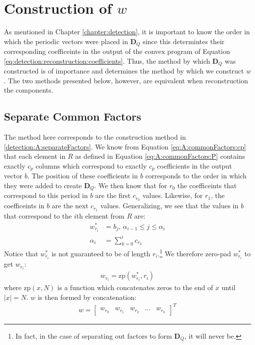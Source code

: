 \section{Construction of $w$}\label{section:extraction:constructionOfW}
As mentioned in Chapter \ref{chapter:detection}, it is important to know the order in which the periodic vectors were placed in $\bm{D}_Q$ since this determintes their corresponding coefficeints in the output of the convex program of Equation \eqref{eq:detection:reconstruction:coefficients}. Thus, the method by which $\bm{D}_Q$ was constructed is of importance and determines the method by which we construct $w$. The two methods presented below, however, are equivalent when reconstruction the components.

    \subsection{Separate Common Factors}\label{section:extraction:constructionOfw:separateFactors}
    The method here corresponds to the construction method in \ref{detection:A:separateFactors}. We know from Equation \eqref{eq:A:commonFactors:cp} that each element in $R$ as defined in Equation \eqref{eq:A:commonFactors:P} contains exactly $c_{p}$ columns which correspond to exactly $c_{p}$ coefficients in the output vector $b$. The position of these coefficients in $b$ corresponds to the order in which they were added to create $\bm{D}_Q$.
    We then know that for $r_0$ the coefficeints that correspond to this period in $b$ are the first $c_{r_0}$ values. Likewise, for $r_1$, the coefficeints in $b$ are the next $c_{r_1}$ values. Generalizing, we see that the values in $b$ that correspond to the $i$th element from $R$ are:
    \begin{align}
        w_{r_i}^{*} &= b_j \text{, } \alpha_{i-1} \leq j \leq \alpha_{i} \label{eq:extraction:constructionOfw:separate:w_pi}\\
        \alpha_{i} &= \sum_{k = 0}^{i} c_{r_k} \label{eq:extraction:constructionOfw:separate:alpha}
    \end{align}
    Notice that $w_{r_i}^{*}$ is not guaranteed to be of length $r_i$.\footnote{In fact, in the case of separating out factors to form $\bm{D}_Q$, it will never be.} We therefore zero-pad $w_{r_i}^{*}$ to get $w_{r_i}$:
    \begin{align}
        w_{r_i} = \text{zp}(w_{r_i}^{*}, r_i)
    \end{align}
    where $\text{zp}(x, N)$ is a function which concatenates zeros to the end of $x$ until $|x| = N$. $w$ is then formed by concatenation:
    \begin{align}\label{eq:extraction:constructionOfw:w}
        w = \begin{bmatrix}
            w_{r_0} & w_{r_1} & w_{r_2} & \hdots & w_{r_n}
        \end{bmatrix}^{T}
    \end{align}

